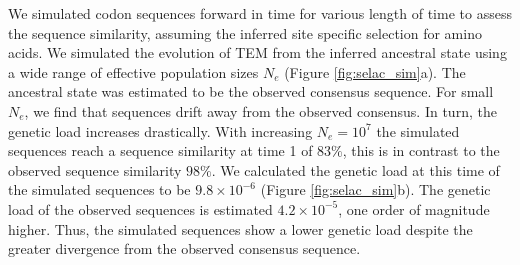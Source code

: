 \documentclass[12pt]{article}
\begin{document}
We simulated codon sequences forward in time for various length of time to assess the sequence similarity, assuming the \selac inferred site specific selection for amino acids.
We simulated the evolution of TEM from the inferred ancestral state using a wide range of effective population sizes $N_e$ (Figure \ref{fig:selac_sim}a).
The ancestral state was estimated to be the observed consensus sequence.
For small $N_e$, we find that sequences drift away from the observed consensus. 
In turn, the genetic load increases drastically.
With increasing $N_e = 10^7$ the simulated sequences reach a sequence similarity at time 1 of $83 \%$, this is in contrast to the observed sequence similarity $98 \%$.
We calculated the genetic load at this time of the simulated sequences to be $9.8\times10^{-6}$ (Figure \ref{fig:selac_sim}b).
The genetic load of the observed sequences is estimated $4.2\times 10^{-5}$, one order of magnitude higher.
Thus, the simulated sequences show a lower genetic load despite the greater divergence from the observed consensus sequence.
\end{document}
